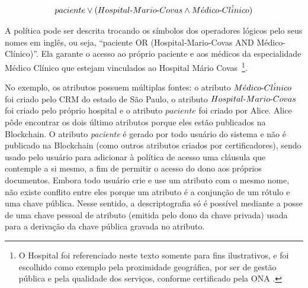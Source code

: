 \documentclass[a4paper,11pt]{article}
\begin{document}
\[paciente \vee (Hospital\textnormal{-}Mario\textnormal{-}Covas \wedge M\acute{e}dico\textnormal{-}Cl\acute{i}nico)\]

A política pode ser descrita trocando os símbolos dos operadores lógicos pelo seus nomes em inglês, ou seja, ``paciente OR (Hospital-Mario-Covas AND Médico-Clínico)''.
Ela garante o acesso ao próprio paciente e aos médicos da especialidade Médico Clínico que estejam vinculados ao Hospital Mário Covas~\footnote{O Hospital foi referenciado neste texto somente para fins ilustrativos, e foi escolhido como exemplo pela proximidade geográfica, por ser de gestão pública e pela qualidade dos serviços, conforme certificado pela ONA \cite{ONA2020}.}.

No exemplo, os atributos possuem múltiplas fontes: o atributo $M\acute{e}dico\textnormal{-}Cl\acute{i}nico$ foi criado pelo CRM do estado de São Paulo, o atributo $Hospital\textnormal{-}Mario\textnormal{-}Covas$ foi criado pelo próprio hospital e o atributo $paciente$ foi criado por Alice.
Alice pôde encontrar os dois último atributos porque eles estão publicados na Blockchain.
O atributo \textit{paciente} é gerado por todo usuário do sistema e não é publicado na Blockchain (como outros atributos criados por certificadores), sendo usado pelo usuário para adicionar à política de acesso uma cláusula que contemple a si mesmo, a fim de permitir o acesso do dono aos próprios documentos.
Embora todo usuário crie e use um atributo com o mesmo nome, não existe conflito entre eles porque um atributo é a conjunção de um rótulo e uma chave pública. Nesse sentido, a descriptografia só é possível mediante a posse de uma chave pessoal de atributo (emitida pelo dono da chave privada) usada para a derivação da chave pública gravada no atributo. %

\end{document}
